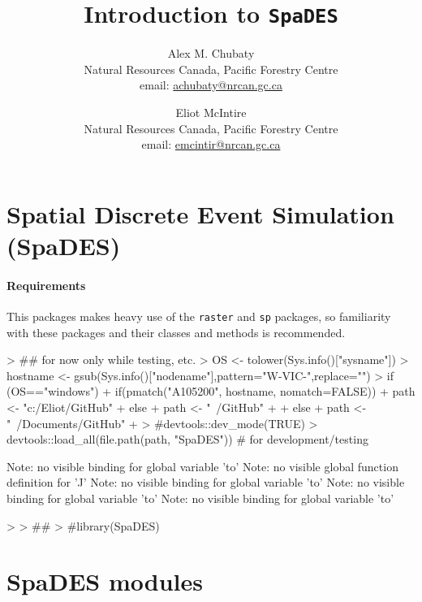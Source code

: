 \documentclass{article}
\title{Introduction to \texttt{SpaDES}}
\author{
  Alex M. Chubaty\\
	\small{Natural Resources Canada, Pacific Forestry Centre}\\
	\small{email: \href{mailto:achubaty@nrcan.gc.ca}{achubaty@nrcan.gc.ca}}
	\and
	Eliot McIntire\\
	\small{Natural Resources Canada, Pacific Forestry Centre}\\
	\small{email: \href{mailto:emcintir@nrcan.gc.ca}{emcintir@nrcan.gc.ca}}
}
\begin{document}


\maketitle

\tableofcontents

\newpage

\section{Spatial Discrete Event Simulation (SpaDES)}

\paragraph{Requirements}
This packages makes heavy use of the \texttt{raster} and \texttt{sp} packages, so familiarity with these packages and their classes and methods is recommended.

\begin{Schunk}
\begin{Sinput}
> ## for now only while testing, etc.
> OS <- tolower(Sys.info()["sysname"])
> hostname <- gsub(Sys.info()["nodename"],pattern="W-VIC-",replace="")
> if (OS=="windows") {
+     if(pmatch("A105200", hostname, nomatch=FALSE)) {
+         path <- "c:/Eliot/GitHub"
+     } else {
+         path <- "~/GitHub"
+     }
+ } else {
+     path <- "~/Documents/GitHub"
+ }
> #devtools::dev_mode(TRUE)
> devtools::load_all(file.path(path, "SpaDES")) # for development/testing
\end{Sinput}
\begin{Soutput}
Note: no visible binding for global variable 'to' 
Note: no visible global function definition for 'J' 
Note: no visible binding for global variable 'to' 
Note: no visible binding for global variable 'to' 
Note: no visible binding for global variable 'to' 
\end{Soutput}
\begin{Sinput}
> 
> ## 
> #library(SpaDES)
\end{Sinput}
\end{Schunk}


\newpage

\section{SpaDES modules}

\lipsum
\end{document}
